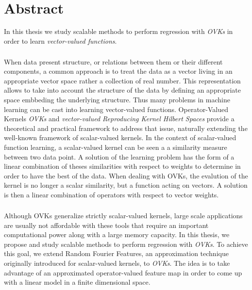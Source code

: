 



\begingroup
\let\clearpage\relax
\let\cleardoublepage\relax
\let\cleardoublepage\relax

\chapter*{Abstract}
In this thesis we study scalable methods to perform regression with
\emph{\acl{OVK}s} in order to learn \emph{vector-valued functions}.
\paragraph{}
When data present structure, or relations between them or their different
components, a common approach is to treat the data as a vector living in an
appropriate vector space rather a collection of real number. This
representation allows to take into account the structure of the data by
defining an appropriate space embbeding the underlying structure. Thus many
problems in machine learning can be cast into learning vector-valued functions.
Operator-Valued Kernels \emph{\acl{OVK}s} and \emph{vector-valued Reproducing
Kernel Hilbert Spaces} provide a theoretical and practical framework to address
that issue, naturally extending the well-known framework of scalar-valued
kernels. In the context of scalar-valued function learning, a scalar-valued
kernel can be seen a a similarity measure between two data point. A solution of
the learning problem has the form of a linear combination of theses
similarities with respect to weights to determine in order to have the best
 of the data. When dealing with \acl{OVK}s, the evalution of the
kernel is no longer a scalar similarity, but a function acting on vectors. A
solution is then a linear combination of operators with respect to vector
weights.
\paragraph{} 
Although \acl{OVK}s generalize strictly scalar-valued kernels,
large scale applications are usually not affordable with these tools that
require an important computational power along with a large memory capacity. In
this thesis, we propose and study scalable methods to perform regression with
\emph{\acl{OVK}s}. To achieve this goal, we extend Random Fourier Features, an
approximation technique originally introduced for scalar-valued kernels, to
\emph{\acl{OVK}s}. The idea is to take advantage of an approximated
operator-valued feature map in order to come up with a linear model in a finite
dimensional space.
